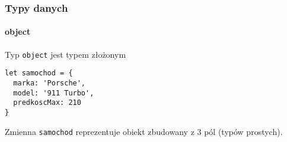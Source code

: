 \begin{frame}[fragile]
  \frametitle{Typy danych}
  \framesubtitle{object}

 Typ \verb|object| jest typem złożonym

  \begin{verbatim}
let samochod = {
  marka: 'Porsche',
  model: '911 Turbo',
  predkoscMax: 210
}
  \end{verbatim}

  Zmienna \verb|samochod| reprezentuje obiekt zbudowany z 3 pól (typów prostych).

\end{frame}
